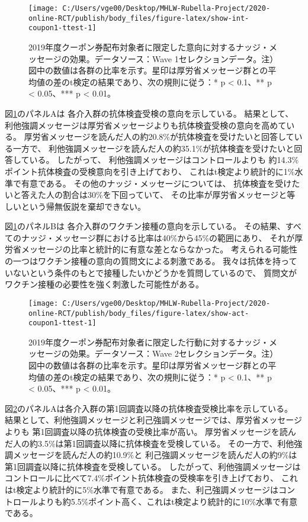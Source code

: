 \documentclass[
  11pt,
  a4paper,
]{article}
\begin{document}
\begin{figure}[t]
\texttt{[image: C:/Users/vge00/Desktop/MHLW-Rubella-Project/2020-online-RCT/publish/body\_files/figure-latex/show-int-coupon1-ttest-1]} \caption{2019年度クーポン券配布対象者に限定した意向に対するナッジ・メッセージの効果。データソース：Wave 1セレクションデータ。注）図中の数値は各群の比率を示す。星印は厚労省メッセージ群との平均値の差のt検定の結果であり、次の規則に従う：* p < 0.1、** p < 0.05、*** p < 0.01。}\label{fig:show-int-coupon1-ttest}
\end{figure}

図\ref{fig:show-int-coupon1-ttest}のパネルAは
各介入群の抗体検査受検の意向を示している。
結果として、
利他強調メッセージは厚労省メッセージよりも抗体検査受検の意向を高めている。
厚労省メッセージを読んだ人の約20.8\%が抗体検査を受けたいと回答している一方で、
利他強調メッセージを読んだ人の約35.1\%が抗体検査を受けたいと回答している。
したがって、
利他強調メッセージはコントロールよりも
約14.3\%ポイント抗体検査の受検意向を引き上げており、
これはt検定より統計的に1\%水準で有意である。
その他のナッジ・メッセージについては、
抗体検査を受けたいと答えた人の割合は30\%を下回っていて、
その比率が厚労省メッセージと等しいという帰無仮説を棄却できない。

図\ref{fig:show-int-coupon1-ttest}のパネルBは
各介入群のワクチン接種の意向を示している。
その結果、すべてのナッジ・メッセージ群における比率は40\%から45\%の範囲にあり、
それが厚労省メッセージの比率と統計的に有意な差とならなかった。
考えられる可能性の一つはワクチン接種の意向の質問文による刺激である。
我々は抗体を持っていないという条件のもとで接種したいかどうかを質問しているので、
質問文がワクチン接種の必要性を強く刺激した可能性がある。

\begin{figure}[t]
\texttt{[image: C:/Users/vge00/Desktop/MHLW-Rubella-Project/2020-online-RCT/publish/body\_files/figure-latex/show-act-coupon1-ttest-1]} \caption{2019年度クーポン券配布対象者に限定した行動に対するナッジ・メッセージの効果。データソース：Wave 2セレクションデータ。注）図中の数値は各群の比率を示す。星印は厚労省メッセージ群との平均値の差のt検定の結果であり、次の規則に従う：* p < 0.1、** p < 0.05、*** p < 0.01。}\label{fig:show-act-coupon1-ttest}
\end{figure}

図\ref{fig:show-act-coupon1-ttest}のパネルAは各介入群の第1回調査以降の抗体検査受検比率を示している。
結果として、利他強調メッセージと利己強調メッセージでは、厚労省メッセージよりも
第1回調査以降の抗体検査の受検比率が高い。
厚労省メッセージを読んだ人の約3.5\%は第1回調査以降に抗体検査を受検している。
その一方で、利他強調メッセージを読んだ人の約10.9\%と
利己強調メッセージを読んだ人の約9\%は第1回調査以降に抗体検査を受検している。
したがって、利他強調メッセージはコントロールに比べて7.4\%ポイント抗体検査の受検率を引き上げており、
これはt検定より統計的に5\%水準で有意である。
また、利己強調メッセージはコントロールよりも約5.5\%ポイント高く、これはt検定より統計的に10\%水準で有意である。
\end{document}
